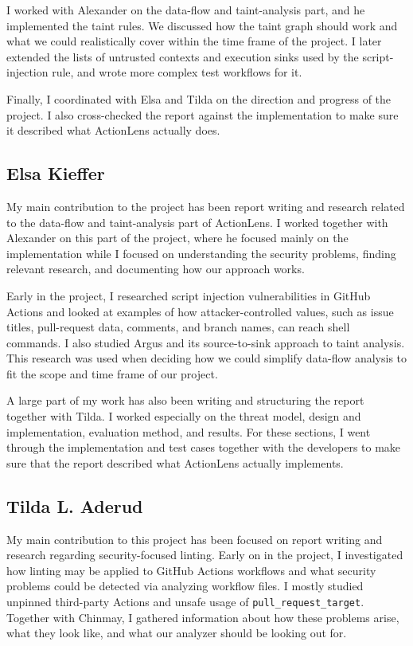 \documentclass{article}
\begin{document}
I worked with Alexander on the data-flow and taint-analysis part, and he implemented the taint rules. We discussed how the taint graph should work and what we could realistically cover within the time frame of the project. I later extended the lists of untrusted contexts and execution sinks used by the script-injection rule, and wrote more complex test workflows for it.

Finally, I coordinated with Elsa and Tilda on the direction and progress of the project. I also cross-checked the report against the implementation to make sure it described what ActionLens actually does.

\subsection{Elsa Kieffer}

My main contribution to the project has been report writing and research related
to the data-flow and taint-analysis part of ActionLens. I worked together with
Alexander on this part of the project, where he focused mainly on the
implementation while I focused on understanding the security problems, finding
relevant research, and documenting how our approach works.

Early in the project, I researched script injection vulnerabilities in GitHub
Actions and looked at examples of how attacker-controlled values, such as issue
titles, pull-request data, comments, and branch names, can reach shell commands.
I also studied Argus and its source-to-sink approach to taint analysis. This
research was used when deciding how we could simplify data-flow analysis to fit
the scope and time frame of our project.

A large part of my work has also been writing and structuring the report
together with Tilda. I worked especially on the threat model, design and
implementation, evaluation method, and results. For these sections, I went
through the implementation and test cases together with the developers to make
sure that the report described what ActionLens actually implements. 

\subsection{Tilda L. Aderud}

My main contribution to this project has been focused on report writing and research regarding security-focused linting. Early on in the project, I investigated how linting may be applied to GitHub Actions workflows and what security problems could be detected via analyzing workflow files. I mostly studied unpinned third-party Actions and unsafe usage of \texttt{pull\_request\_target}. Together with Chinmay, I gathered information about how these problems arise, what they look like, and what our analyzer should be looking out for. 
\end{document}
